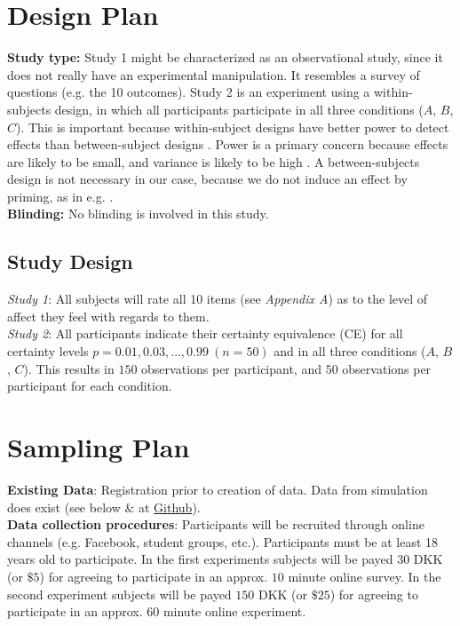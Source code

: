 \documentclass[12pt]{article}
\begin{document}
 \section{Design Plan}

\textbf{Study type:} Study 1 might be characterized
as an observational study, since it does not
really have an experimental manipulation. It
resembles a survey of questions (e.g. the 10
outcomes). Study 2 is an experiment using a
within-subjects design, in which all participants
participate in all three conditions ($A$,  $B$,  $C$).
This is important because within-subject designs
have better power to detect effects than
between-subject designs
\autocite{charness2012experimental}. Power is a
primary concern because effects are likely
to be small, and variance is likely to be high
\autocite{gonzalez1999shape}. A between-subjects
design is not necessary in our case, because we do
not induce an effect by priming, as in e.g.
\textcite{hsee2004music}. \\

\textbf{Blinding:} No blinding is involved in this study. \\

\subsection{Study Design}

\emph{Study 1}: All subjects will rate all 10 items
(see \emph{Appendix A}) as to the level of affect they
feel with regards to them. \\

\emph{Study 2}: All participants
indicate their certainty equivalence (CE) for all
certainty levels $p = 0.01, 0.03, \ldots, 0.99 \: (n = 50)$
and in all three conditions ($A$,  $B$,  $C$).
This results in $150$ observations per participant,
and  $50$ observations per participant for each
condition.

\section{Sampling Plan}

\textbf{Existing Data}: Registration prior
to creation of data. Data from simulation
does exist (see below \& at
\href{https://github.com/victor-m-p/BayesianDecisionWeights}{Github}). \\

\textbf{Data collection procedures}:
Participants will be recruited through online
channels (e.g. Facebook, student groups, etc.).
Participants must be at least 18 years old to
participate. In the first experiments subjects
will be payed $30$ DKK (or $\$5$)
for agreeing to participate
in an approx. $10$ minute online survey. In the
second experiment subjects will be payed $150$ DKK
(or $\$25$)
for agreeing to participate in an approx. $60$ minute
online experiment. \\
\end{document}
